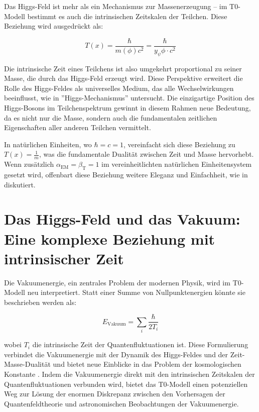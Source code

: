 \documentclass[a4paper,12pt]{article}
\newcommand{\Tfield}{T(x)}
\newcommand{\betaT}{\beta_{\text{T}}}
\newcommand{\alphaEM}{\alpha_{\text{EM}}}
\begin{document}
	Das Higgs-Feld ist mehr als ein Mechanismus zur Massenerzeugung – im T0-Modell bestimmt es auch die intrinsischen Zeitskalen der Teilchen. Diese Beziehung wird ausgedrückt als:
	
	\begin{equation}
		\Tfield = \frac{\hbar}{m(\phi) c^2} = \frac{\hbar}{y_\psi \phi \cdot c^2}
	\end{equation}
	
	Die intrinsische Zeit eines Teilchens ist also umgekehrt proportional zu seiner Masse, die durch das Higgs-Feld erzeugt wird. Diese Perspektive erweitert die Rolle des Higgs-Feldes als universelles Medium, das alle Wechselwirkungen beeinflusst, wie in ''Higgs-Mechanismus'' \cite{pascher_higgs_2025} untersucht. Die einzigartige Position des Higgs-Bosons im Teilchenspektrum gewinnt in diesem Rahmen neue Bedeutung, da es nicht nur die Masse, sondern auch die fundamentalen zeitlichen Eigenschaften aller anderen Teilchen vermittelt.
	
	In natürlichen Einheiten, wo \(\hbar = c = 1\), vereinfacht sich diese Beziehung zu \(\Tfield = \frac{1}{m}\), was die fundamentale Dualität zwischen Zeit und Masse hervorhebt. Wenn zusätzlich \(\alphaEM = \betaT = 1\) im vereinheitlichten natürlichen Einheitensystem gesetzt wird, offenbart diese Beziehung weitere Eleganz und Einfachheit, wie in \cite{pascher_alphabeta_2025} diskutiert.
	
	\section{Das Higgs-Feld und das Vakuum: Eine komplexe Beziehung mit intrinsischer Zeit}
	
	Die Vakuumenergie, ein zentrales Problem der modernen Physik, wird im T0-Modell neu interpretiert. Statt einer Summe von Nullpunktenergien könnte sie beschrieben werden als:
	
	\begin{equation}
		E_\text{Vakuum} = \sum_i \frac{\hbar}{2 T_i}
	\end{equation}
	
	wobei \(T_i\) die intrinsische Zeit der Quantenfluktuationen ist. Diese Formulierung verbindet die Vakuumenergie mit der Dynamik des Higgs-Feldes und der Zeit-Masse-Dualität und bietet neue Einblicke in das Problem der kosmologischen Konstante \cite{weinberg1989cosmological}. Indem die Vakuumenergie direkt mit den intrinsischen Zeitskalen der Quantenfluktuationen verbunden wird, bietet das T0-Modell einen potenziellen Weg zur Lösung der enormen Diskrepanz zwischen den Vorhersagen der Quantenfeldtheorie und astronomischen Beobachtungen der Vakuumenergie.
	
\end{document}
